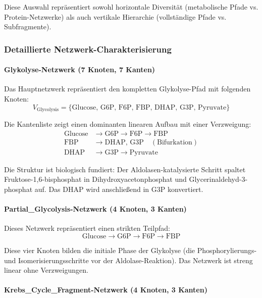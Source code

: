 ﻿\documentclass[a4paper,12pt]{article}
\theoremstyle{definition}
\begin{document}
Diese Auswahl repräsentiert sowohl horizontale Diversität (metabolische Pfade vs. Protein-Netzwerke) als auch vertikale Hierarchie (vollständige Pfade vs. Subfragmente).

\subsubsection{Detaillierte Netzwerk-Charakterisierung}

\paragraph{Glykolyse-Netzwerk (7 Knoten, 7 Kanten)}

Das Hauptnetzwerk repräsentiert den kompletten Glykolyse-Pfad mit folgenden Knoten:
\[
V_{\text{Glycolysis}} = \{\text{Glucose, G6P, F6P, FBP, DHAP, G3P, Pyruvate}\}
\]

Die Kantenliste zeigt einen dominanten linearen Aufbau mit einer Verzweigung:
\begin{align*}
	\text{Glucose} &\rightarrow \text{G6P} \rightarrow \text{F6P} \rightarrow \text{FBP} \\
	\text{FBP} &\rightarrow \text{DHAP, G3P} \quad (\text{Bifurkation}) \\
	\text{DHAP} &\rightarrow \text{G3P} \rightarrow \text{Pyruvate}
\end{align*}

Die Struktur ist biologisch fundiert: Der Aldolasen-katalysierte Schritt spaltet Fruktose-1,6-bisphosphat in Dihydroxyacetonphosphat und Glycerinaldehyd-3-phosphat auf. Das DHAP wird anschließend in G3P konvertiert.

\paragraph{Partial\_Glycolysis-Netzwerk (4 Knoten, 3 Kanten)}

Dieses Netzwerk repräsentiert einen strikten Teilpfad:
\[
\text{Glucose} \rightarrow \text{G6P} \rightarrow \text{F6P} \rightarrow \text{FBP}
\]

Diese vier Knoten bilden die initiale Phase der Glykolyse (die Phosphorylierungs- und Isomerisierungsschritte vor der Aldolase-Reaktion). Das Netzwerk ist streng linear ohne Verzweigungen.

\paragraph{Krebs\_Cycle\_Fragment-Netzwerk (4 Knoten, 3 Kanten)}
\end{document}
